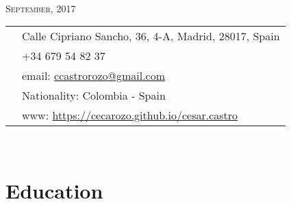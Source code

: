 \documentclass[11pt]{article}\usepackage[]{graphicx}\usepackage[]{color}
\begin{document}
\par{\\
\vspace{5pt}
{\color{headings} \scshape{September, 2017}}\\
\vspace{10pt}}

\colorbox{shade}{{
\begin{tabular}{c|p{13cm}}
\vspace{5pt}\raisebox{-4pt}{\textifsymbol{18}} & Calle Cipriano Sancho, 36, 4-A, Madrid, 28017, Spain\\
\vspace{5pt}\raisebox{-4pt}{\Mobilefone} & +34 679 54 82 37\\
\vspace{5pt}\raisebox{-4pt}{\Letter} & email: \href{mailto:ccastrorozo@gmail.com}{ccastrorozo@gmail.com} \\
\vspace{5pt}\raisebox{-4pt}{\Aquarius} & Nationality: Colombia - Spain\\
\vspace{5pt}\raisebox{-4pt}{\Mundus} & www: \href{https://cecarozo.github.io/cesar.castro}{https://cecarozo.github.io/cesar.castro}\\
\end{tabular}
}
}\\[10pt]


\section{Education} 
\end{document}
